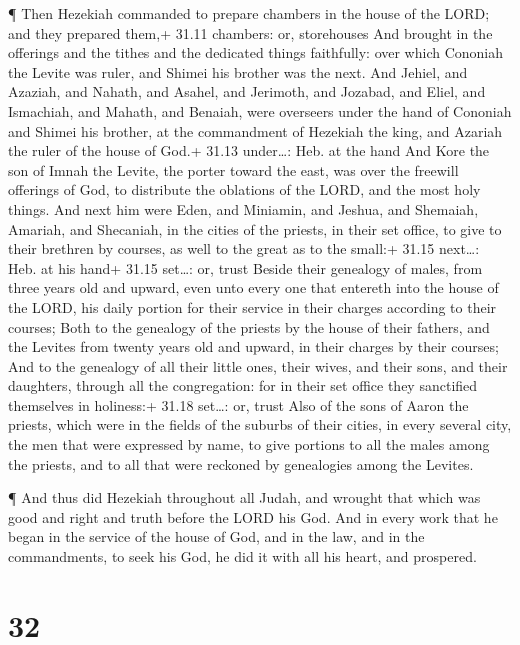  ¶ Then Hezekiah commanded to prepare chambers in the house
of the LORD; and they prepared them,+ 31.11 chambers: or, storehouses
 And brought in the offerings and the tithes and the
dedicated things faithfully: over which Cononiah the Levite was ruler,
and Shimei his brother was the next.  And Jehiel, and
Azaziah, and Nahath, and Asahel, and Jerimoth, and Jozabad, and Eliel,
and Ismachiah, and Mahath, and Benaiah, were overseers under the hand of
Cononiah and Shimei his brother, at the commandment of Hezekiah the
king, and Azariah the ruler of the house of God.+ 31.13 under\ldots:
Heb. at the hand  And Kore the son of Imnah the Levite, the
porter toward the east, was over the freewill offerings of God, to
distribute the oblations of the LORD, and the most holy things.
 And next him were Eden, and Miniamin, and Jeshua, and
Shemaiah, Amariah, and Shecaniah, in the cities of the priests, in their
set office, to give to their brethren by courses, as well to the great
as to the small:+ 31.15 next\ldots: Heb. at his hand+ 31.15 set\ldots:
or, trust  Beside their genealogy of males, from three
years old and upward, even unto every one that entereth into the house
of the LORD, his daily portion for their service in their charges
according to their courses;  Both to the genealogy of the
priests by the house of their fathers, and the Levites from twenty years
old and upward, in their charges by their courses;  And to
the genealogy of all their little ones, their wives, and their sons, and
their daughters, through all the congregation: for in their set office
they sanctified themselves in holiness:+ 31.18 set\ldots: or, trust
 Also of the sons of Aaron the priests, which were in the
fields of the suburbs of their cities, in every several city, the men
that were expressed by name, to give portions to all the males among the
priests, and to all that were reckoned by genealogies among the Levites.

 ¶ And thus did Hezekiah throughout all Judah, and wrought
that which was good and right and truth before the LORD his God.
 And in every work that he began in the service of the
house of God, and in the law, and in the commandments, to seek his God,
he did it with all his heart, and prospered.

\hypertarget{section-31}{%
\section{32}\label{section-31}}

